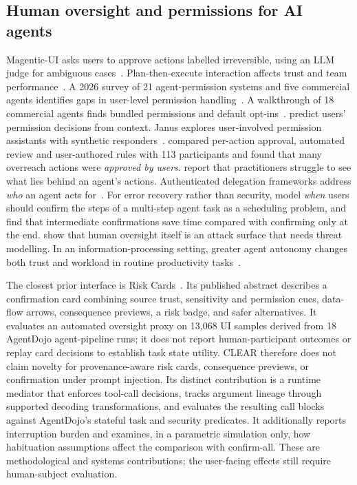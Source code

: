 \documentclass[preprint,12pt,nonatbib]{elsarticle}
\theoremstyle{remark}
\begin{document}
\subsection{Human oversight and permissions for AI agents}
Magentic-UI asks users to approve actions labelled irreversible, using an LLM
judge for ambiguous cases~\citep{mozannar2025magentic}. Plan-then-execute
interaction affects trust and team performance~\citep{he2025plan}. A 2026
survey of 21 agent-permission systems and five commercial agents identifies
gaps in user-level permission handling~\citep{michael2026permission}. A
walkthrough of 18 commercial agents finds bundled permissions and default
opt-ins~\citep{ge2026authorization}. \citet{wu2026permissions} predict users'
permission decisions from context. Janus explores user-involved permission
assistants with synthetic responders~\citep{brigham2026janus}.
\citet{yan2026policies} compared per-action approval, automated review and
user-authored rules with 113 participants and found that many overreach actions
were \emph{approved by users}. \citet{salerno2026agent} report that
practitioners struggle to see what lies behind an agent's actions.
Authenticated delegation frameworks address \emph{who} an agent acts
for~\citep{south2025delegation}. For error recovery rather than security,
\citet{zhou2026check} model \emph{when} users should confirm the steps of a
multi-step agent task as a scheduling problem, and find that intermediate
confirmations save time compared with confirming only at the end.
\citet{ditz2026oversight} show that human oversight itself is an attack surface
that needs threat modelling. In an information-processing setting, greater agent
autonomy changes both trust and workload in routine productivity
tasks~\citep{geninatti2026autonomy}.

The closest prior interface is Risk Cards~\citep{su2026riskcards}. Its
published abstract describes a confirmation card combining source trust,
sensitivity and permission cues, data-flow arrows, consequence previews, a
risk badge, and safer alternatives. It evaluates an automated oversight proxy
on 13,068 UI samples derived from 18 AgentDojo agent-pipeline runs; it does not
report human-participant outcomes or replay card decisions to establish task
state utility. CLEAR therefore does not claim novelty for provenance-aware
risk cards, consequence previews, or confirmation under prompt injection. Its
distinct contribution is a runtime mediator that enforces tool-call decisions,
tracks argument lineage through supported decoding transformations, and
evaluates the resulting call blocks against AgentDojo's stateful task and
security predicates. It additionally reports interruption burden and
examines, in a parametric simulation only, how habituation assumptions affect
the comparison with confirm-all. These are methodological and systems
contributions; the user-facing effects still require human-subject evaluation.
\end{document}
